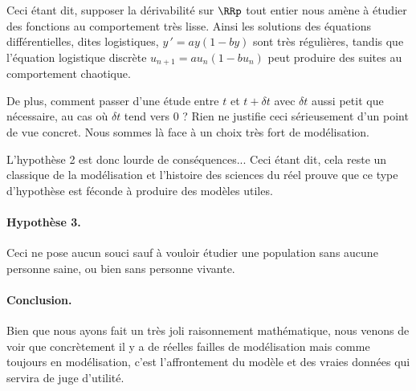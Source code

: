Ceci étant dit, supposer la dérivabilité sur $\RRp$ tout entier nous amène à étudier des fonctions au comportement très lisse.
Ainsi les solutions des équations différentielles, dites logistiques, $y\,' = a y (1 - b y)$ sont très régulières, tandis que l'équation logistique discrète $u_{n+1} = a u_n (1 - b u_n)$ peut produire des suites au comportement chaotique. 

\smallskip

De plus, comment passer d'une étude entre $t$ et $t + \delta t$ avec $\delta t$ aussi petit que nécessaire, au cas où $\delta t$ tend vers $0$ ? Rien ne justifie ceci sérieusement d'un point de vue concret. Nous sommes là face à un choix très fort de modélisation.

\smallskip

L'hypothèse 2 est donc lourde de conséquences... Ceci étant dit, cela reste un classique de la modélisation et l'histoire des sciences du réel prouve que ce type d'hypothèse est féconde à produire des modèles utiles.




\paragraph{Hypothèse 3.} Ceci ne pose aucun souci sauf à vouloir étudier une population sans aucune personne saine, ou bien sans personne vivante.




\paragraph{Conclusion.} Bien que nous ayons fait un très joli raisonnement mathématique, nous venons de voir que concrètement il y a de réelles failles de modélisation mais comme toujours en modélisation, c'est l'affrontement du modèle et des vraies données qui servira de juge d'utilité.
